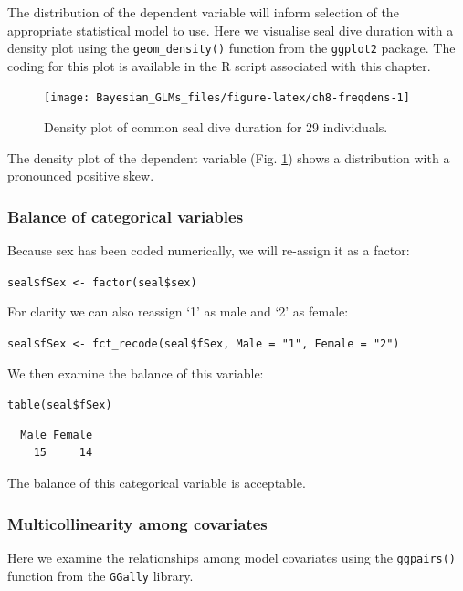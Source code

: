 \documentclass[
]{book}
\begin{document}
The distribution of the dependent variable will inform selection of the appropriate statistical model to use. Here we visualise seal dive duration with a density plot using the \texttt{geom\_density()} function from the \texttt{ggplot2} package. The coding for this plot is available in the R script associated with this chapter.



\begin{figure}

{\centering \texttt{[image: Bayesian\_GLMs\_files/figure-latex/ch8-freqdens-1]} 

}

\caption{Density plot of common seal dive duration for 29 individuals.}\label{fig:ch8-freqdens}
\end{figure}

The density plot of the dependent variable (Fig. \ref{fig:ch8-freqdens}) shows a distribution with a pronounced positive skew.

\hypertarget{gamma-balance}{%
\subsubsection{Balance of categorical variables}\label{gamma-balance}}

Because sex has been coded numerically, we will re-assign it as a factor:

\texttt{seal\$fSex\ \textless{}-\ factor(seal\$sex)}

For clarity we can also reassign `1' as male and `2' as female:

\texttt{seal\$fSex\ \textless{}-\ fct\_recode(seal\$fSex,\ Male\ =\ "1",\ Female\ =\ "2")}

We then examine the balance of this variable:

\texttt{table(seal\$fSex)}

\begin{verbatim}
  Male Female 
    15     14 
\end{verbatim}

The balance of this categorical variable is acceptable.

\hypertarget{gamma-collin}{%
\subsubsection{Multicollinearity among covariates}\label{gamma-collin}}

Here we examine the relationships among model covariates using the \texttt{ggpairs()} function from the \texttt{GGally} library.
\end{document}
